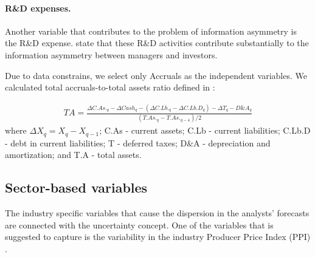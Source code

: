 \paragraph{R\&D expenses.}
Another variable that contributes to the problem of information asymmetry is the R\&D expense. \cite{aboody2000} state that these R\&D activities contribute substantially to the information asymmetry between managers and investors. 

Due to data constrains, we select only Accruals as  the independent variables. We calculated total accruals-to-total assets ratio defined in \cite{creamer2009}:

\begin{eqnarray}
TA=\frac{\Delta C.As._q - \Delta Cash_q - (\Delta C.Lb._q - \Delta C.Lb.D_q) - \Delta T_q - D\& A_q}{(T.As._q - T.As._{q-4})/2}
\end{eqnarray}
where $\Delta X_q=X_q-X_{q-1}$; C.As - current assets; C.Lb - current liabilities; C.Lb.D - debt in current liabilities; T - deferred taxes; D\&A - depreciation and amortization; and T.A - total assets. 



\subsection{Sector-based variables}
The industry specific variables that cause the dispersion in the analysts' forecasts are connected  with the uncertainty concept. One of the variables that is suggested to capture is the variability in the industry Producer Price Index (PPI) \citep{henley2003}. 



